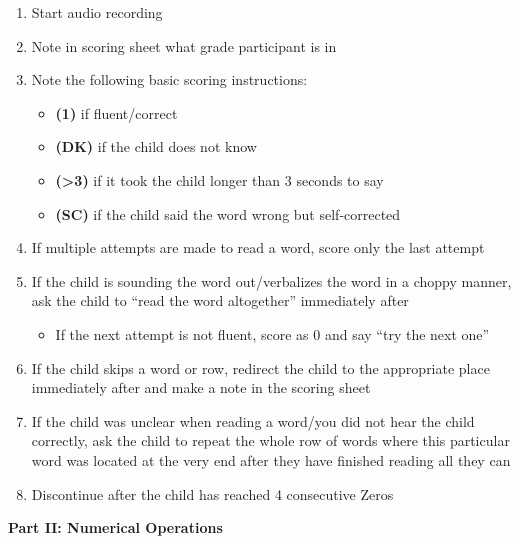 \documentclass[
]{book}
\providecommand{\tightlist}{%
  \setlength{\itemsep}{0pt}\setlength{\parskip}{0pt}}
\begin{document}
\begin{enumerate}
\def\labelenumi{\arabic{enumi}.}
\tightlist
\item
  Start audio recording
\item
  Note in scoring sheet what grade participant is in
\item
  Note the following basic scoring instructions:

  \begin{itemize}
  \tightlist
  \item
    \textbf{(1)} if fluent/correct
  \item
    \textbf{(DK)} if the child does not know
  \item
    \textbf{(\textgreater3)} if it took the child longer than 3 seconds to say
  \item
    \textbf{(SC)} if the child said the word wrong but self-corrected
  \end{itemize}
\item
  If multiple attempts are made to read a word, score only the last attempt
\item
  If the child is sounding the word out/verbalizes the word in a choppy manner, ask the child to ``read the word altogether'' immediately after

  \begin{itemize}
  \tightlist
  \item
    If the next attempt is not fluent, score as 0 and say ``try the next one''
  \end{itemize}
\item
  If the child skips a word or row, redirect the child to the appropriate place immediately after and make a note in the scoring sheet
\item
  If the child was unclear when reading a word/you did not hear the child correctly, ask the child to repeat the whole row of words where this particular word was located at the very end after they have finished reading all they can
\item
  Discontinue after the child has reached 4 consecutive Zeros
\end{enumerate}

\textbf{Part II: Numerical Operations}
\end{document}
